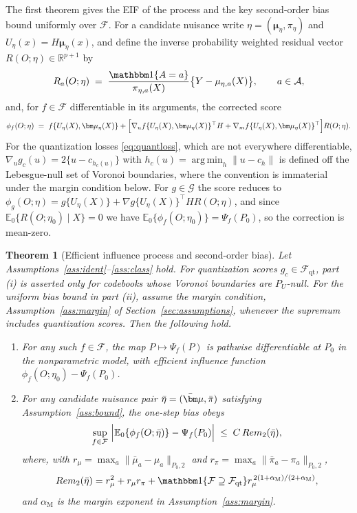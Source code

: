 \documentclass[11pt]{article}
\newtheorem{theorem}{Theorem}%
\newcommand{\E}{\mathbb E}
\newcommand{\R}{\mathbb R}
\newcommand{\ind}[1]{\mathbbm 1\{#1\}}
\DeclareMathOperator*{\argmin}{arg\,min}
\newcommand{\calA}{\mathcal A}
\newcommand{\calF}{\mathcal F}
\newcommand{\calG}{\mathcal G}
\newcommand{\bmu}{\bm\mu}
\newcommand{\norm}[1]{\lVert #1\rVert}
\newcommand{\am}{\alpha_{\mathrm M}}
\begin{document}
The first theorem gives the EIF of the process and the key second-order bias bound uniformly over $\calF$. For a candidate nuisance write $\eta=(\bmu_\eta,\pi_\eta)$ and $U_\eta(x)=H\bmu_\eta(x)$, and define the inverse probability weighted residual vector $R(O;\eta)\in\R^{p+1}$ by
\begin{equation}\label{eq:residual}
R_a(O;\eta)\;=\;\frac{\ind{A=a}}{\pi_{\eta,a}(X)}\bigl\{Y-\mu_{\eta,a}(X)\bigr\},\qquad a\in\calA ,
\end{equation}
and, for $f\in\calF$ differentiable in its arguments, the corrected score
\begin{equation}\label{eq:score}
\phi_f(O;\eta)\;=\;f\{U_\eta(X),\bmu_\eta(X)\}
+\Bigl[\nabla_u f\{U_\eta(X),\bmu_\eta(X)\}^\top H+\nabla_m f\{U_\eta(X),\bmu_\eta(X)\}^\top\Bigr]R(O;\eta).
\end{equation}
For the quantization losses \eqref{eq:quantloss}, which are not everywhere differentiable, $\nabla_u g_c(u)=2\{u-c_{h_c(u)}\}$ with $h_c(u)=\argmin_{h}\norm{u-c_h}$ is defined off the Lebesgue-null set of Voronoi boundaries, where the convention is immaterial under the margin condition below. For $g\in\calG$ the score reduces to $\phi_g(O;\eta)=g\{U_\eta(X)\}+\nabla g\{U_\eta(X)\}^\top HR(O;\eta)$, and since $\E_0\{R(O;\eta_0)\mid X\}=0$ we have $\E_0\{\phi_f(O;\eta_0)\}=\Psi_f(P_0)$, so the correction is mean-zero.

\begin{theorem}[Efficient influence process and second-order bias]\label{thm:eif}
Let Assumptions~\ref{ass:ident}--\ref{ass:class} hold. For quantization scores $g_c\in\calF_{\mathrm{qt}}$, part \textup{(i)} is asserted only for codebooks whose Voronoi boundaries are $P_U$-null. For the uniform bias bound in part \textup{(ii)}, assume the margin condition, Assumption~\ref{ass:margin} of Section~\ref{sec:assumptions}, whenever the supremum includes quantization scores. Then the following hold.
\begin{enumerate}[label=(\roman*),leftmargin=2em]
\item For any such $f\in\calF$, the map $P\mapsto\Psi_f(P)$ is pathwise differentiable at $P_0$ in the nonparametric model, with efficient influence function $\phi_f(O;\eta_0)-\Psi_f(P_0)$.

\item For any candidate nuisance pair $\bar\eta=(\bar\bmu,\bar\pi)$ satisfying Assumption~\ref{ass:bound}, the one-step bias obeys
\begin{equation}\label{eq:bias}
\sup_{f\in\calF}\ \Bigl|\E_0\{\phi_f(O;\bar\eta)\}-\Psi_f(P_0)\Bigr|
\;\le\; C\,Rem_2(\bar\eta),
\end{equation}
where, with 
$r_\mu=\max_a\norm{\bar\mu_a-\mu_a}_{P_0,2}$ and 
$r_\pi=\max_a\norm{\bar\pi_a-\pi_a}_{P_0,2}$,
\begin{equation}\label{eq:R2}
Rem_2(\bar\eta) = r_\mu^2+r_\mu r_\pi +\ind{\calF\supseteq\calF_{\mathrm{qt}}} r_\mu^{\,2(1+\am)/(2+\am)} ,
\end{equation}
and $\am$ is the margin exponent in Assumption~\ref{ass:margin}.
\end{enumerate}
\end{theorem}
\end{document}
